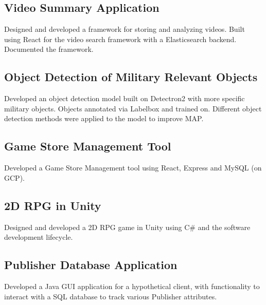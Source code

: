 \documentclass[a4paper, 12pt]{article}
\begin{document}
\subsection {{}\hfill }

\subsection {{Video Summary Application}\hfill }
 Designed and developed a framework for storing and analyzing videos. Built using React for the video search framework with a Elasticsearch backend. Documented the framework.

\subsection {{}\hfill }
\subsection {{Object Detection of Military Relevant Objects}\hfill }
Developed an object detection model built on Detectron2 with more specific military objects. Objects annotated via Labelbox and trained on. Different object detection methods were applied to the model to improve MAP.
\subsection {{}\hfill }

\subsection {{Game Store Management Tool}\hfill }
Developed a Game Store Management tool using React, Express and MySQL (on GCP).
\subsection {{}\hfill }

\subsection {{2D RPG in Unity}\hfill }
Designed and developed a 2D RPG game in Unity using C\# and the software development lifecycle.
\subsection {{}\hfill }

\subsection {{Publisher Database Application}\hfill }
 Developed a Java GUI application for a hypothetical client, with functionality to interact with a SQL database to track various Publisher attributes.
\end{document}
